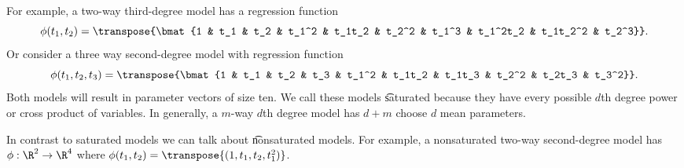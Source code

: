 For example, a two-way third-degree model has a regression function
  \[
\phi (t_1, t_2) = \transpose{\bmat{1 & t_1 & t_2 & t_1^2 & t_1t_2 & t_2^2 & t_1^3 & t_1^2t_2 & t_1t_2^2 & t_2^3}}.
  \]
Or consider a three way second-degree model with regression function
  \[
\phi (t_1, t_2, t_3) = \transpose{\bmat{1 & t_1 & t_2 & t_3 & t_1^2 & t_1t_2 & t_1t_3 & t_2^2 & t_2t_3 & t_3^2}}.
  \]
Both models will result in parameter vectors of size ten.
We call these models \t{saturated} because they have every possible $d$th degree power or cross product of variables.
In generally, a $m$-way $d$th degree model has $d+m$ choose $d$ mean parameters.

In contrast to saturated models we can talk about \t{nonsaturated} models.
For example, a nonsaturated two-way second-degree model has $\phi : \R ^2 \to \R ^4$ where $\phi (t_1, t_2) = \transpose{(1 , t_1 , t_2 , t_1^2)}$.
